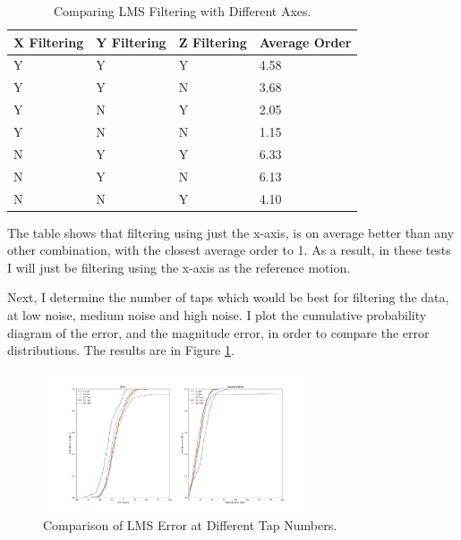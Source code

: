 \documentclass[12pt,a4paper,twoside,openright]{report}
\begin{document}
\begin{table}[]
\centering
\caption{Comparing LMS Filtering with Different Axes.}
\label{table:lms-errors}
\begin{tabular}{|l|l|l|l|}
\hline
X Filtering & Y Filtering & Z Filtering & Average Order \\ \hline
Y           & Y           & Y           & 4.58          \\
Y           & Y           & N           & 3.68          \\
Y           & N           & Y           & 2.05          \\
Y           & N           & N           & 1.15          \\
N           & Y           & Y           & 6.33          \\
N           & Y           & N           & 6.13          \\
N           & N           & Y           & 4.10          \\
\hline
\end{tabular}
\end{table}

The table shows that filtering using just the x-axis, is on average better
than any other combination, with the closest average order to 1. As a result,
in these tests I will just be filtering using the x-axis as the reference
motion.

Next, I determine the number of taps which would be best for filtering the
data, at low noise, medium noise and high noise. I plot the cumulative
probability diagram of the error, and the magnitude error, in order to compare
the error distributions. The results are in Figure \ref{fig:lms-medium}.

\begin{figure}[tbh]
	\centerline{\includegraphics[width=0.7\textwidth]{figs/lms-taps-error-medium-noise.png}}
	\caption{Comparison of LMS Error at Different Tap Numbers.}
	\label{fig:lms-medium}
\end{figure}
\end{document}
